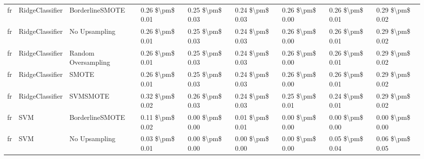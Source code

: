 \begin{tabular}{lllllllll}
      fr &                 RidgeClassifier &               BorderlineSMOTE &     0.26 \$\textbackslash pm\$ 0.01 &           0.25 \$\textbackslash pm\$ 0.03 &       0.24 \$\textbackslash pm\$ 0.03 &        0.26 \$\textbackslash pm\$ 0.00 &                         0.26 \$\textbackslash pm\$ 0.01 &     0.29 \$\textbackslash pm\$ 0.02 \\
      fr &                 RidgeClassifier &                 No Upsampling &     0.26 \$\textbackslash pm\$ 0.01 &           0.25 \$\textbackslash pm\$ 0.03 &       0.24 \$\textbackslash pm\$ 0.03 &        0.26 \$\textbackslash pm\$ 0.00 &                         0.26 \$\textbackslash pm\$ 0.01 &     0.29 \$\textbackslash pm\$ 0.02 \\
      fr &                 RidgeClassifier &           Random Oversampling &     0.26 \$\textbackslash pm\$ 0.01 &           0.25 \$\textbackslash pm\$ 0.03 &       0.24 \$\textbackslash pm\$ 0.03 &        0.26 \$\textbackslash pm\$ 0.00 &                         0.26 \$\textbackslash pm\$ 0.01 &     0.29 \$\textbackslash pm\$ 0.02 \\
      fr &                 RidgeClassifier &                         SMOTE &     0.26 \$\textbackslash pm\$ 0.01 &           0.25 \$\textbackslash pm\$ 0.03 &       0.24 \$\textbackslash pm\$ 0.03 &        0.26 \$\textbackslash pm\$ 0.00 &                         0.26 \$\textbackslash pm\$ 0.01 &     0.29 \$\textbackslash pm\$ 0.02 \\
      fr &                 RidgeClassifier &                      SVMSMOTE &     0.32 \$\textbackslash pm\$ 0.02 &           0.26 \$\textbackslash pm\$ 0.03 &       0.24 \$\textbackslash pm\$ 0.03 &        0.25 \$\textbackslash pm\$ 0.01 &                         0.24 \$\textbackslash pm\$ 0.01 &     0.29 \$\textbackslash pm\$ 0.02 \\
      fr &                             SVM &               BorderlineSMOTE &     0.11 \$\textbackslash pm\$ 0.02 &           0.00 \$\textbackslash pm\$ 0.00 &       0.01 \$\textbackslash pm\$ 0.01 &        0.00 \$\textbackslash pm\$ 0.00 &                         0.00 \$\textbackslash pm\$ 0.00 &     0.00 \$\textbackslash pm\$ 0.00 \\
      fr &                             SVM &                 No Upsampling &     0.03 \$\textbackslash pm\$ 0.01 &           0.00 \$\textbackslash pm\$ 0.00 &       0.00 \$\textbackslash pm\$ 0.00 &        0.00 \$\textbackslash pm\$ 0.00 &                         0.05 \$\textbackslash pm\$ 0.04 &     0.06 \$\textbackslash pm\$ 0.05 \\

\end{tabular}
